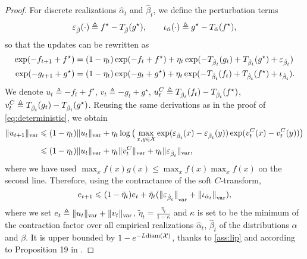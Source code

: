 \begin{proof}
For discrete realizations $\hat \alpha_t$ and $\hat \beta_t$, we define the perturbation terms
\begin{equation}
    \epsilon_{\hat \beta}(\cdot) \triangleq
    f^\star - \Ctrans{g^\star}{\hat \beta} ,\qquad
    \iota_{\hat \alpha}(\cdot) \triangleq 
    g^\star - \Ctrans{f^\star}{\hat \alpha},
\end{equation}
so that the updates can be rewritten as
\begin{align}
    \exp(-f_{t+1} + f^\star) &= (1 - \eta_t)
    \exp(-f_{t} + f^\star)
    + \eta_t \exp(-\Ctrans{g_t}{\hat \beta_t} 
    +\Ctrans{g^\star}{\hat \beta_t} + \epsilon_{\hat \beta_t}) \\
    \exp(-g_{t+1} + g^\star) &= (1 - \eta_t)
    \exp(-g_{t} + g^\star)
    + \eta_t \exp(-\Ctrans{f_t}{\hat \beta_t} 
    +\Ctrans{f^\star}{\hat \beta_t} + \iota_{\hat \beta_t}).
\end{align}
We denote $u_t \triangleq -f_{t} + f^\star$, $v_t \triangleq -g_{t} + g^\star$, $u_t^C \triangleq
\Ctrans{f_t}{\hat \beta_t} - \Ctrans{f^\star}{\hat \beta_t}$, $v_t^C \triangleq
\Ctrans{g_t}{\hat \beta_t} - \Ctrans{g^\star}{\hat \beta_t}$. Reusing the same
derivations as in the proof of \autoref{eq:deterministic}, we obtain
    \label{eq:pre_ineq_var}
    \begin{align}
    \Vert u_{t+1} \Vert_{\var} &\leq
    (1 - \eta_t) \Vert u_t \Vert_{\var}
    + \eta_t \log \big( \max_{x, y \in \Xx}
    \exp(\epsilon_{\hat \beta_t}(x) 
    - \epsilon_{\hat \beta_t}(y)) \exp(v_t^C(x) - v_t^C(y)) \big) \\ 
    &\leq
    (1 - \eta_t) \Vert u_t \Vert_{\var}
    + \eta_t \Vert v_t^C \Vert_{\var}
    + \eta_t \Vert \epsilon_{\hat \beta_t} \Vert_{\var},
\end{align}
where we have used $\max_x f(x) g(x) \leq \max_x f(x) \max_x f(x)$ on the second line. Therefore,
using the contractance of the soft $C$-transform,
\begin{equation}
    \label{eq:ineq_var}
    e_{t+1} \leq 
    (1 - \tilde \eta_t) e_t
    + \tilde \eta_t
    ({\Vert \epsilon_{\hat \beta_t} \Vert}_{\var} + 
    {\Vert \iota_{\hat \alpha_t} \Vert}_{\var}),
\end{equation}
where we set $e_t \triangleq \Vert u_t \Vert_{\var} + \Vert v_t \Vert_{\var}$,
$\tilde \eta_t = \frac{\eta_t}{1-\kappa}$ and $\kappa$ is set to be the minimum
of the contraction factor over all empirical realizations $\hat \alpha_t$, $\hat
\beta_t$ of the distributions $\alpha$ and $\beta$. It is upper bounded by
$1 - e^{- L\text{diam}(\Xx)}$, thanks to \autoref{ass:lip} and according to Proposition 19 in \citet{vialard2019elementary}.


\end{proof}

